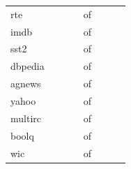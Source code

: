{\begin{tabular}{lrrrrrrr}
    rte & \AudScaleLongPtSevenArrive{} & \AudScaleLongPtSevenEnd{} & \AudScaleLongPtSevenChanged{} & \AudScaleLongPtSevenC{} of \AudScaleLongPtSevenM{} & \AudScaleLongPtSevenAuditEst{} & \AudScaleLongPtSevenBound{} & \AudScaleLongPtSevenHEnd{} \\
    imdb & \AudScaleLongPtEightArrive{} & \AudScaleLongPtEightEnd{} & \AudScaleLongPtEightChanged{} & \AudScaleLongPtEightC{} of \AudScaleLongPtEightM{} & \AudScaleLongPtEightAuditEst{} & \AudScaleLongPtEightBound{} & \AudScaleLongPtEightHEnd{} \\
    sst2 & \AudScaleLongPtNineArrive{} & \AudScaleLongPtNineEnd{} & \AudScaleLongPtNineChanged{} & \AudScaleLongPtNineC{} of \AudScaleLongPtNineM{} & \AudScaleLongPtNineAuditEst{} & \AudScaleLongPtNineBound{} & \AudScaleLongPtNineHEnd{} \\
    dbpedia & \AudScaleLongPtTenArrive{} & \AudScaleLongPtTenEnd{} & \AudScaleLongPtTenChanged{} & \AudScaleLongPtTenC{} of \AudScaleLongPtTenM{} & \AudScaleLongPtTenAuditEst{} & \AudScaleLongPtTenBound{} & \AudScaleLongPtTenHEnd{} \\
    agnews & \AudScaleLongPtElevenArrive{} & \AudScaleLongPtElevenEnd{} & \AudScaleLongPtElevenChanged{} & \AudScaleLongPtElevenC{} of \AudScaleLongPtElevenM{} & \AudScaleLongPtElevenAuditEst{} & \AudScaleLongPtElevenBound{} & \AudScaleLongPtElevenHEnd{} \\
    yahoo & \AudScaleLongPtTwelveArrive{} & \AudScaleLongPtTwelveEnd{} & \AudScaleLongPtTwelveChanged{} & \AudScaleLongPtTwelveC{} of \AudScaleLongPtTwelveM{} & \AudScaleLongPtTwelveAuditEst{} & \AudScaleLongPtTwelveBound{} & \AudScaleLongPtTwelveHEnd{} \\
    multirc & \AudScaleLongPtThirteenArrive{} & \AudScaleLongPtThirteenEnd{} & \AudScaleLongPtThirteenChanged{} & \AudScaleLongPtThirteenC{} of \AudScaleLongPtThirteenM{} & \AudScaleLongPtThirteenAuditEst{} & \AudScaleLongPtThirteenBound{} & \AudScaleLongPtThirteenHEnd{} \\
    boolq & \AudScaleLongPtFourteenArrive{} & \AudScaleLongPtFourteenEnd{} & \AudScaleLongPtFourteenChanged{} & \AudScaleLongPtFourteenC{} of \AudScaleLongPtFourteenM{} & \AudScaleLongPtFourteenAuditEst{} & \AudScaleLongPtFourteenBound{} & \AudScaleLongPtFourteenHEnd{} \\
    wic & \AudScaleLongPtFifteenArrive{} & \AudScaleLongPtFifteenEnd{} & \AudScaleLongPtFifteenChanged{} & \AudScaleLongPtFifteenC{} of \AudScaleLongPtFifteenM{} & \AudScaleLongPtFifteenAuditEst{} & \AudScaleLongPtFifteenBound{} & \AudScaleLongPtFifteenHEnd{} \\
    \bottomrule
\end{tabular}}
